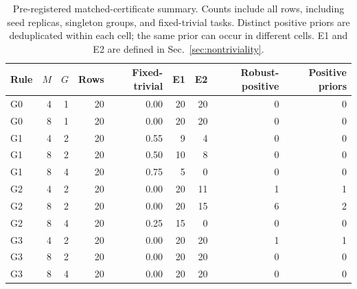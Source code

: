 \begin{table}[tbp]
\caption{Pre-registered matched-certificate summary. Counts include all rows, including seed replicas, singleton groups, and fixed-trivial tasks. Distinct positive priors are deduplicated within each cell; the same prior can occur in different cells. E1 and E2 are defined in Sec.~\ref{sec:nontriviality}.}
\label{tab:registered}
\centering\small
\begin{tabular}{@{}lrrrrrrr r@{}}
\toprule
\textbf{Rule} & $M$ & $G$ & \textbf{Rows} & \textbf{Fixed-trivial} & \textbf{E1} & \textbf{E2} & \textbf{Robust-positive} & \textbf{Positive priors} \\
\midrule
G0 & 4 & 1 & 20 & 0.00 & 20 & 20 & 0 & 0 \\
G0 & 8 & 1 & 20 & 0.00 & 20 & 20 & 0 & 0 \\
G1 & 4 & 2 & 20 & 0.55 & 9 & 4 & 0 & 0 \\
G1 & 8 & 2 & 20 & 0.50 & 10 & 8 & 0 & 0 \\
G1 & 8 & 4 & 20 & 0.75 & 5 & 0 & 0 & 0 \\
G2 & 4 & 2 & 20 & 0.00 & 20 & 11 & 1 & 1 \\
G2 & 8 & 2 & 20 & 0.00 & 20 & 15 & 6 & 2 \\
G2 & 8 & 4 & 20 & 0.25 & 15 & 0 & 0 & 0 \\
G3 & 4 & 2 & 20 & 0.00 & 20 & 20 & 1 & 1 \\
G3 & 8 & 2 & 20 & 0.00 & 20 & 20 & 0 & 0 \\
G3 & 8 & 4 & 20 & 0.00 & 20 & 20 & 0 & 0 \\
\bottomrule
\end{tabular}
\end{table}
